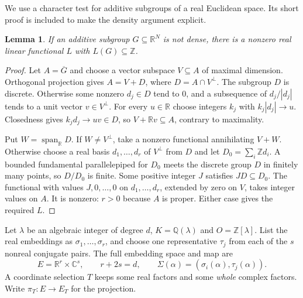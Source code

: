 \documentclass[11pt]{article}
\newtheorem{lemma}[theorem]{Lemma}
\newcommand{\C}{\mathbb C}
\newcommand{\R}{\mathbb R}
\newcommand{\Z}{\mathbb Z}
\newcommand{\Q}{\mathbb Q}
\begin{document}
We use a character test for additive subgroups of a real Euclidean space.
Its short proof is included to make the density argument explicit.

\begin{lemma}\label{lem:character}
If an additive subgroup $G\subseteq\R^N$ is not dense, there is a
nonzero real linear functional $L$ with $L(G)\subseteq\Z$.
\end{lemma}
\begin{proof}
Let $A=\overline G$ and choose a vector subspace $V\subseteq A$
of maximal dimension. Orthogonal projection gives
$A=V+D$, where $D=A\cap V^\perp$.
The subgroup $D$ is discrete. Otherwise some nonzero $d_j\in D$
tend to $0$, and a subsequence of $d_j/|d_j|$ tends to a unit
vector $v\in V^\perp$. For every $u\in\R$ choose integers $k_j$
with $k_j|d_j|\to u$. Closedness gives $k_jd_j\to uv\in D$,
so $V+\R v\subseteq A$, contrary to maximality.

Put $W=\operatorname{span}_{\R}D$. If $W\ne V^\perp$, take a
nonzero functional annihilating $V+W$. Otherwise choose a real basis
$d_1,\ldots,d_r$ of $V^\perp$ from $D$ and let
$D_0=\sum_i\Z d_i$. A bounded fundamental parallelepiped for $D_0$
meets the discrete group $D$ in finitely many points, so $D/D_0$ is
finite. Some positive integer $J$ satisfies $JD\subseteq D_0$.
The functional with values $J,0,\ldots,0$ on $d_1,\ldots,d_r$,
extended by zero on $V$, takes integer values on $A$. It is nonzero:
$r>0$ because $A$ is proper. Either case gives the required $L$.
\end{proof}

Let $\lambda$ be an algebraic integer of degree $d$,
$K=\Q(\lambda)$ and $O=\Z[\lambda]$. List the real embeddings
as $\sigma_1,\ldots,\sigma_r$, and choose one representative
$\tau_j$ from each of the $s$ nonreal conjugate pairs. The full
embedding space and map are
\[
 E=\R^r\times\C^s,\qquad r+2s=d,\qquad
 \Sigma(\alpha)=(\sigma_i(\alpha),\tau_j(\alpha)).
\]
A coordinate selection $T$ keeps some real factors and some \emph{whole}
complex factors. Write $\pi_T:E\to E_T$ for the projection.
\end{document}
